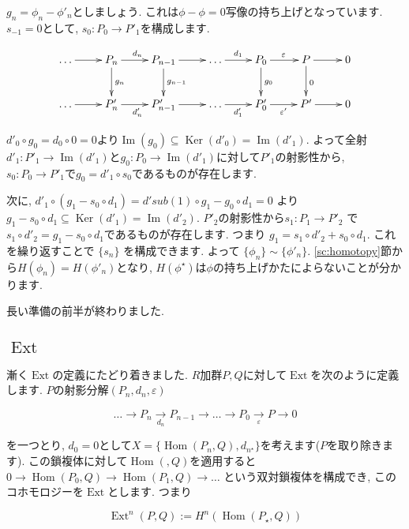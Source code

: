 \documentclass{jsarticle}
\newcommand{\makeop}[1]{\mathop{\mathrm{#1}}\nolimits}
\def\Im{\makeop{Im}}
\def\Ker{\makeop{Ker}}
\def\Hom{\makeop{Hom}}
\def\Ext{\makeop{Ext}}
\theoremstyle{definition}
\numberwithin{theorem}{section}
\begin{document}
$g_n = \phi_n - \phi'_n$としましょう. これは$\phi-\phi = 0$写像の持ち上げとなっています. $s_{-1} = 0$として,
$s_0: P_0 \rightarrow P'_1$を構成します. 

\begin{equation*}
\xymatrix{
  \ldots \ar[r] & P_n \ar[r]^{d_n} \ar[d]^{g_n} & P_{n-1} \ar[r] \ar[d]^{g_{n-1}} & \ldots \ar[r]^{d_1} & P_0 \ar[r]^{\varepsilon} \ar[d]^{g_0} & P \ar[r] \ar[d]^{0} & 0 \\
  \ldots \ar[r] & P'_n \ar[r]_{d'_n} & P'_{n-1} \ar[r]& \ldots \ar[r]_{d'_1}& P'_0 \ar[r]_{\varepsilon'} & P' \ar[r]& 0
}
\end{equation*}

$d'_0\circ g_0 = d_0\circ 0 = 0$より$\Im(g_0) \subseteq \Ker(d'_0) = \Im(d'_1)$. よって全射
$d'_1: P'_1 \rightarrow \Im(d'_1)$と$g_0: P_0 \rightarrow \Im(d'_1)$に対して$P'_1$の射影性から, 
$s_0: P_0 \rightarrow P'_1$で$g_0 = d'_1 \circ s_0$であるものが存在します.

次に, $d'_1\circ(g_1 - s_0\circ d_1) = d'sub(1)\circ g_1 - g_0 \circ d_1 = 0$ より
$g_1 - s_0 \circ d_1 \subseteq \Ker(d'_1) = \Im(d'_2)$.
$P'_2$の射影性から$s_1: P_1 \rightarrow P'_2$ で $s_1\circ d'_2 = g_1 - s_0\circ d_1$であるものが存在します. つまり
$g_1 = s_1\circ d'_2 + s_0\circ d_1$. これを繰り返すことで $\{s_n\}$ を構成できます. よって $\{\phi_n\} \sim \{\phi'_n\}$.
\ref{sc:homotopy}節から$H(\phi_n) = H(\phi'_n)$となり, $H(\phi^\star)$は$\phi$の持ち上げかたによらないことが分かります.

長い準備の前半が終わりました.

\subsection{$\Ext$}
漸く$\Ext$の定義にたどり着きました.
$R$加群$P, Q$に対して$\Ext$を次のように定義します. $P$の射影分解$(P_n, d_n, \varepsilon)$

\begin{equation*}
\ldots \rightarrow P_n \xrightarrow[d_n]{} P_{n-1} \rightarrow \ldots \rightarrow P_0 \xrightarrow[\varepsilon]{} P \rightarrow 0
\end{equation*}

を一つとり, $d_0 = 0$として$X = \{\Hom(P_n, Q), d_{n^\star}\}$を考えます($P$を取り除きます).
この鎖複体に対して$\Hom(, Q)$を適用すると$0\rightarrow \Hom(P_0, Q) \rightarrow \Hom(P_1, Q) \rightarrow \ldots$
という双対鎖複体を構成でき, このコホモロジーを$\Ext$とします. つまり

\begin{equation*}
\Ext^n(P, Q) := H^n(\Hom(P_\star, Q))
\end{equation*}
\end{document}
